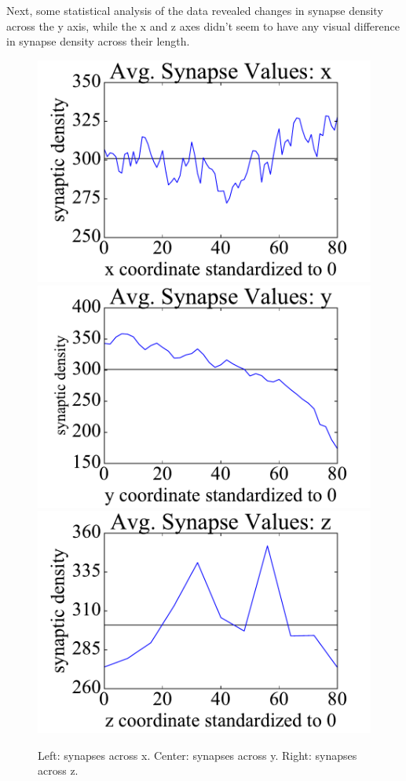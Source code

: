 \documentclass{article}
\begin{document}
Next, some statistical analysis of the data revealed changes in synapse density across the y axis, while the x and z axes didn't seem to have any visual difference in synapse density across their length.

\begin{figure}[h]
  \centering
  \includegraphics[scale = .3]{Fig2a}
  \includegraphics[scale = .3]{Fig2b}
  \includegraphics[scale = .3]{Fig2c}
  \caption{Left: synapses across x. Center: synapses across y. Right: synapses across z.}
\end{figure}
\end{document}
